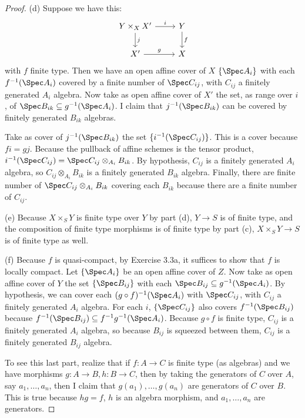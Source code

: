 \begin{proof}
	(d) Suppose we have this:
	\[
	\begin{tikzcd}
	Y \times_X X' & Y\\
	X' & X
	\arrow["i",from=1-1,to=1-2]
	\arrow["j",from=1-1,to=2-1]
	\arrow["g",from=2-1,to=2-2]
	\arrow["f",from=1-2,to=2-2]
	\end{tikzcd}
	\]
	with $f $ finite type.
	Then we have an open affine cover of $X $ $\{\Spec A_i\}$ with each $f^{-1}(\Spec A_i) $ covered by a finite number of $\Spec C_{ij} $, with $C_{ij} $ a finitely generated $A_i $ algebra.
	Now take as open affine cover of $X' $ the set, as range over $i $ , of $\Spec B_{ik} \subseteq g^{-1}(\Spec A_i)$.
	I claim that $j^{-1}(\Spec B_{ik}) $ can be covered by finitely generated $B_{ik} $ algebras.

	Take as cover of $j^{-1}(\Spec B_{ik}) $ the set $\{i^{-1}(\Spec C_{ij}) \}$.
	This is a cover because $fi = gj $.
	Because the pullback of affine schemes is the tensor product, $i^{-1}(\Spec C_{ij}) = \Spec C_{ij} \otimes_{A_i} B_{ik}$.
	By hypothesis, $C_{ij} $ is a finitely generated $A_{i} $ algebra, so $C_{ij} \otimes_{A_{i}} B_{ik}$ is a finitely generated $B_{ik} $ algebra.
	Finally, there are finite number of $\Spec C_{ij} \otimes_{A_i} B_{ik} $ covering each $B_{ik} $ because there are a finite number of $C_{ij} $.

	(e) Because $X \times_S Y $ is finite type over $Y $ by part (d), $Y\to S $ is of finite type, and the composition of finite type morphisms is of finite type by part (c), $X \times _S Y \to S $ is of finite type as well.

	(f) Because $f $ is quasi-compact, by Exercise 3.3a, it suffices to show that $f $ is locally compact.
	Let $\{\Spec A_i\} $ be an open affine cover of $Z $.
	Now take as open affine cover of $Y $ the set $\{\Spec B_{ij}\}   $ with each $\Spec B_{ij} \subseteq g^{-1}(\Spec A_i) $.
	By hypothesis, we can cover each $(g\circ f)^{-1}(\Spec A_i) $ with $\Spec C_{ij} $, with $C_{ij} $ a finitely generated $A_i $ algebra.
	For each $i $, $\{\Spec C_{ij}\}   $ also covers $f^{-1}(\Spec B_{ij}) $ because $f^{-1}(\Spec B_{ij}) \subseteq f^{-1}g^{-1}(\Spec A_i) $.
	Because $g\circ f $ is finite type, $C_{ij} $ is a finitely generated $A_i $ algebra, so because $B_{ij} $ is squeezed between them, $C_{ij} $ is a finitely generated $B_{ij} $ algebra.

	To see this last part, realize that if $f:A \to C $ is finite type (as algebras) and we have morphisms $g: A\to B, h: B\to C $, then by taking the generators of $C $ over $A $, say $a_{1},\ldots, a_n $, then I claim that $g(a_{1}), \ldots, g(a_n)$ are generators of $C $ over $B $.
	This is true because $hg = f $, $h $ is an algebra morphism, and $a_{1},\ldots, a_n $ are generators.


\end{proof}
